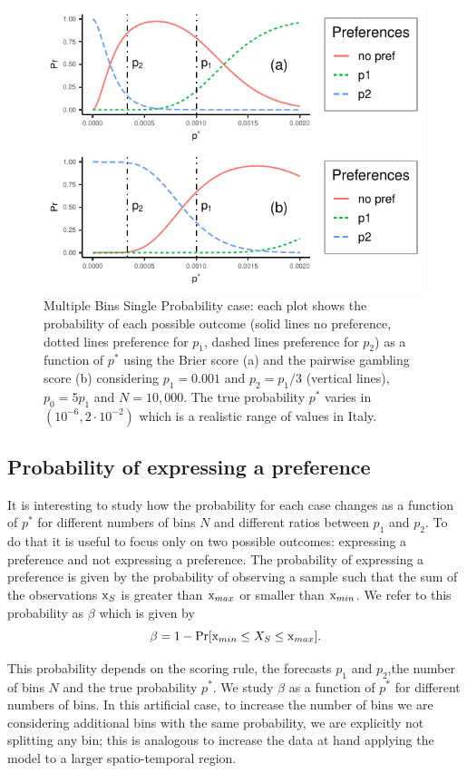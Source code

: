 \documentclass[referee,sn-basic]{sn-jnl}
\theoremstyle{thmstyleone}%
\theoremstyle{thmstyletwo}%
\theoremstyle{thmstylethree}%
\begin{document}
\begin{figure}
  \includegraphics[width = 0.99\textwidth]{figure6.pdf}
\caption{Multiple Bins Single Probability case: each plot shows the probability of each possible outcome (solid lines no preference, dotted lines preference for $p_1$, dashed lines preference for $p_2$) as a function of $p^*$ using the Brier score (a) and the pairwise gambling score (b) considering $p_1 = 0.001$ and $p_2 = p_1/3$ (vertical lines), $p_0 = 5 p_1$ and $N = 10,000$. The true probability $p^*$ varies in $(10^{-6}, 2 \cdot 10^{-2})$ which is a realistic range of values in Italy.}
\label{fig:6}
\end{figure}

\subsection{ Probability of expressing a preference }

It is interesting to study how the probability for each case changes as a function of $p^*$ for different numbers of bins $N$ and different ratios between $p_1$ and $p_2$. To do that it is useful to focus only on two possible outcomes: expressing a preference and not expressing a preference. The probability of expressing a preference is given by the probability of observing a sample such that the sum of the observations $\text x_S$ is greater than $\text x_{max}$ or smaller than $\text x_{min}$. We refer to this probability as $\beta$ which is given by
$$
\beta = 1 - \Pr[\text x_{min} \leq X_S \leq \text x_{max}].
$$

This probability depends on the scoring rule, the forecasts $p_1$ and $p_2$,the number of bins $N$ and the true probability $p^*$. We study $\beta$ as a function of $p^*$ for different numbers of bins. In this artificial case, to increase the number of bins we are considering additional bins with the same probability, we are explicitly not splitting any bin; this is analogous to increase the data at hand applying the model to a larger spatio-temporal region.  
\end{document}

